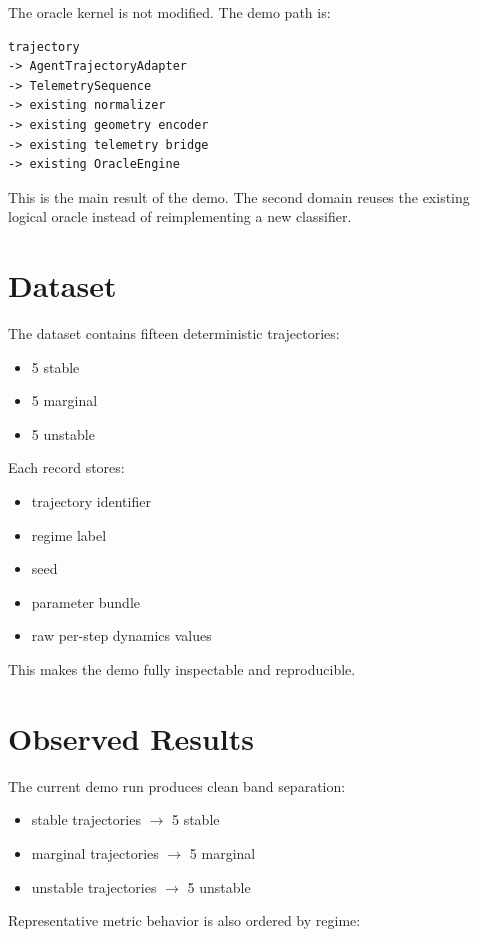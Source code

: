 \documentclass[11pt]{article}
\begin{document}
The oracle kernel is not modified.
The demo path is:

\begin{verbatim}
trajectory
-> AgentTrajectoryAdapter
-> TelemetrySequence
-> existing normalizer
-> existing geometry encoder
-> existing telemetry bridge
-> existing OracleEngine
\end{verbatim}

This is the main result of the demo.
The second domain reuses the existing logical oracle instead of reimplementing a new classifier.

\section{Dataset}

The dataset contains fifteen deterministic trajectories:

\begin{itemize}
\item 5 stable
\item 5 marginal
\item 5 unstable
\end{itemize}

Each record stores:

\begin{itemize}
\item trajectory identifier
\item regime label
\item seed
\item parameter bundle
\item raw per-step dynamics values
\end{itemize}

This makes the demo fully inspectable and reproducible.

\section{Observed Results}

The current demo run produces clean band separation:

\begin{itemize}
\item stable trajectories $\rightarrow$ 5 stable
\item marginal trajectories $\rightarrow$ 5 marginal
\item unstable trajectories $\rightarrow$ 5 unstable
\end{itemize}

Representative metric behavior is also ordered by regime:
\end{document}
